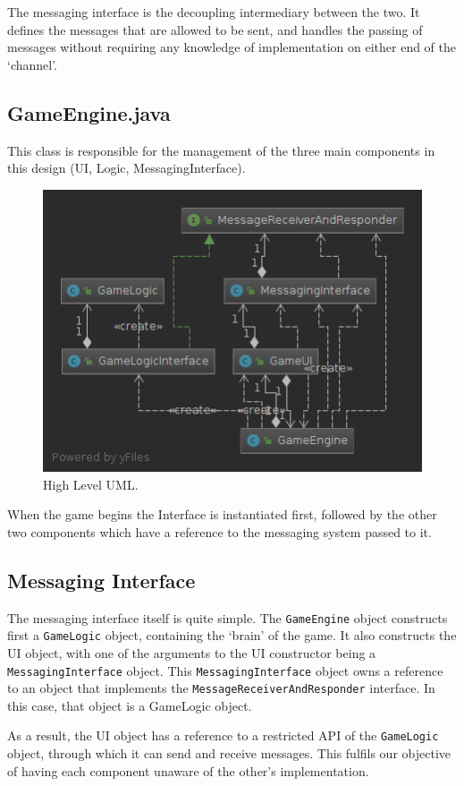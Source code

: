 \documentclass[a4paper, 11pt]{article}
\begin{document}
The messaging interface is the decoupling intermediary between the two. It defines the messages that are allowed to be sent, and handles the passing of messages without requiring any knowledge of implementation on either end of the `channel'.
	
	\subsection*{GameEngine.java}
	This class is responsible for the management of the three main components in this design (UI, Logic, MessagingInterface). 
	\begin{figure}[!h]
		\centering
		\includegraphics[scale=.45]{uml/messaging_system_uml}
		\caption{High Level UML.}
		\label{fig:high_level_uml}
	\end{figure}
	When the game begins the Interface is instantiated first, followed by the other two components which have a reference to the messaging system passed to it.
		
	\subsection*{Messaging Interface}
The messaging interface itself is quite simple. The \texttt{GameEngine} object constructs first a \texttt{GameLogic} object, containing the `brain' of the game. It also constructs the UI object, with one of the arguments to the UI constructor being a \texttt{MessagingInterface} object. This \texttt{MessagingInterface} object owns a reference to an object that implements the \texttt{MessageReceiverAndResponder} interface. In this case, that object is a GameLogic object. 
	
	As a result, the UI object has a reference to a restricted API of the \texttt{GameLogic} object, through which it can send and receive messages. This fulfils our objective of having each component unaware of the other's implementation.
	
\end{document}
